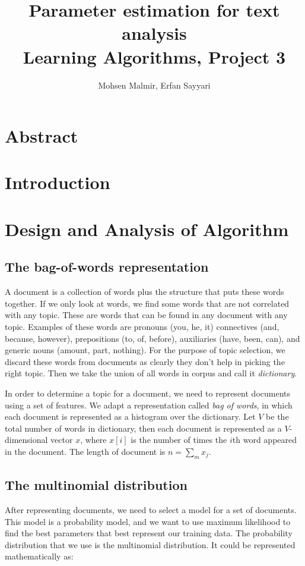 \documentclass[twoside,12pt]{article}
\begin{document}
\title{Parameter estimation for text analysis\\  Learning Algorithms, Project 3}
\author{Mohsen Malmir, Erfan Sayyari}
\maketitle
\section{Abstract}


\section{Introduction}



\section{Design and Analysis of Algorithm}

\subsection{The bag-of-words representation}
A document is a collection of words plus the structure that puts these words together. If we only look at words, we find some words that are not correlated with any topic. These are words that can be found in any document with any topic. Examples of these words are pronouns (you, he, it) connectives (and, because, however), prepositions (to, of, before), auxiliaries (have, been, can), and generic nouns (amount, part, nothing). For the purpose of topic selection, we discard these words from documents as clearly they don't help in picking the right topic. Then we take the union of all words in corpus and call it \emph{dictionary}.

In order to determine a topic for a document, we need to represent  documents using a set of features. We adapt a representation called \emph{bag of words}, in which each document is represented as a histogram over the dictionary. Let $V$ be the total number of words in dictionary, then each document is represented as a $V$-dimensional vector $x$, where $x[i]$ is the number of times the $i$th word appeared in the document. The length of document is $n=\sum_{m}x_j.$
\subsection{The multinomial distribution}
After representing documents, we need to select a model for a set of documents. This model is a probability model, and we want to use maximum likelihood to find the best parameters that best represent our training data. The probability distribution that we use is the multinomial distribution. It could be represented mathematically as:
\end{document}
